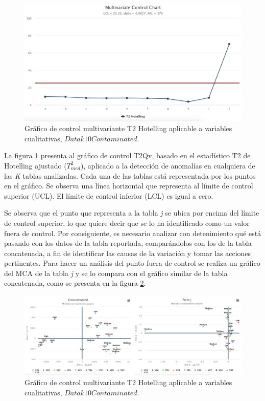 \documentclass[mathematics,article,submit,moreauthors,pdftex]{mdpi}
\begin{document}
\begin{figure}[H]


\begin{center}\includegraphics[width=0.9\linewidth,]{t2} \end{center}

\caption{Gráfico de control multivariante T2 Hotelling aplicable a variables cualitativas, $Datak10Contaminated$.}

\label{fig:tdos}
\end{figure}

La figura \ref{fig:tdos} presenta al gráfico de control T2Qv, basado en
el estadístico T2 de Hotelling ajustado (\(T^2_{med}\)), aplicado a la
detección de anomalías en cualquiera de las \emph{K} tablas analizadas.
Cada una de las tablas está representada por los puntos en el gráfico.
Se observa una línea horizontal que representa al límite de control
superior (UCL). El límite de control inferior (LCL) es igual a cero.

Se observa que el punto que representa a la tabla \emph{j} se ubica por
encima del límite de control superior, lo que quiere decir que se lo ha
identificado como un valor fuera de control. Por consiguiente, es
necesario analizar con detenimiento qué está pasando con los datos de la
tabla reportada, comparándolos con los de la tabla concatenada, a fin de
identificar las causas de la variación y tomar las acciones pertinentes.
Para hacer un análisis del punto fuera de control se realiza un gráfico
del MCA de la tabla \emph{j} y se lo compara con el gráfico similar de
la tabla concatenada, como se presenta en la figura
\ref{fig:comparation}.

\begin{figure}[H]


\begin{center}\includegraphics[width=0.9\linewidth,]{comparation} \end{center}

\caption{Gráfico de control multivariante T2 Hotelling aplicable a variables cualitativas, $Datak10Contaminated$.}

\label{fig:comparation}
\end{figure}
\end{document}
